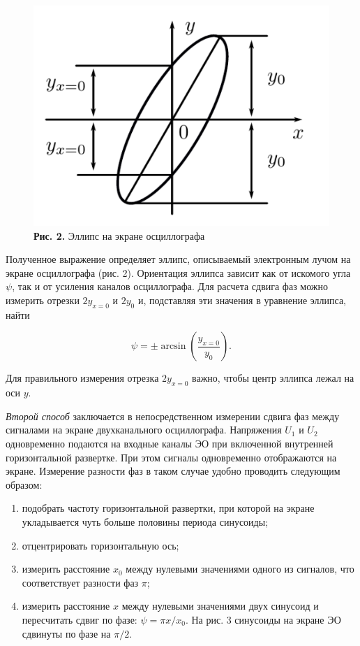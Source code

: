 \documentclass[a4paper,12pt]{article} %
\begin{document}
\begin{figure}
\begin{center}
    \includegraphics[width=1\textwidth]{3.2.1_2.png}
    \textbf{Рис. 2.} Эллипс на экране осциллографа
\end{center}
\end{figure}

\hfill \break Полученное выражение определяет эллипс, описываемый электронным лучом на экране осциллографа (рис. 2). Ориентация эллипса зависит как от искомого угла $\psi$, так и от усиления каналов осциллографа. Для расчета сдвига фаз можно измерить отрезки $2y_{x=0}$ и $2y_{0}$ и, подставляя эти значения в уравнение эллипса, найти

\begin{equation}\label{ linkname }
\psi = \pm \arcsin{\left( \frac{y_{x=0}}{y_{0}} \right)}.
\end{equation}

\hfill \break Для правильного измерения отрезка $2y_{x=0}$ важно, чтобы центр эллипса лежал на оси $y$.

\hfill \break \textit{Второй способ} заключается в непосредственном измерении сдвига фаз между сигналами на экране двухканального осциллографа. Напряжения $U_{1}$ и $U_{2}$ одновременно подаются на входные каналы ЭО при включенной внутренней горизонтальной развертке. При этом сигналы одновременно отображаются на экране. Измерение разности фаз в таком случае удобно проводить следующим образом:

\begin{enumerate}
\item подобрать частоту горизонтальной развертки, при которой на экране укладывается чуть больше половины периода синусоиды;
\item отцентрировать горизонтальную ось;
\item измерить расстояние $x_{0}$ между нулевыми значениями одного из сигналов, что соответствует разности фаз $\pi$;
\item измерить расстояние $x$ между нулевыми значениями двух синусоид и пересчитать сдвиг по фазе: $\psi = \pi x/x_{0}$. На рис. 3 синусоиды на экране ЭО сдвинуты по фазе на $\pi/2$.
\end{enumerate}
\end{document}
